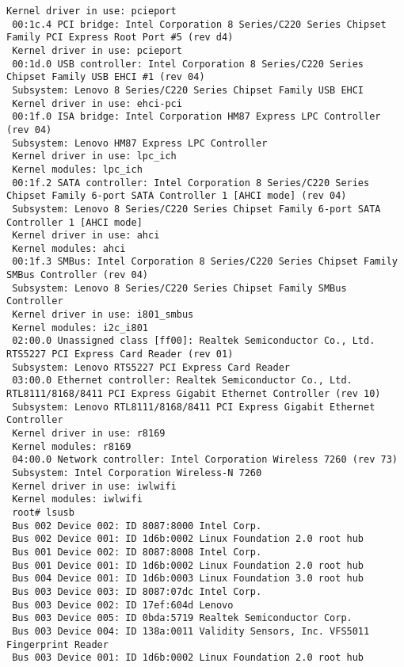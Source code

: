 \documentclass[10pt,a4paper]{article}
\begin{document}
\begin{lstlisting}[style=BashInputRoot]
 Kernel driver in use: pcieport
 00:1c.4 PCI bridge: Intel Corporation 8 Series/C220 Series Chipset Family PCI Express Root Port #5 (rev d4)
 Kernel driver in use: pcieport
 00:1d.0 USB controller: Intel Corporation 8 Series/C220 Series Chipset Family USB EHCI #1 (rev 04)
 Subsystem: Lenovo 8 Series/C220 Series Chipset Family USB EHCI
 Kernel driver in use: ehci-pci
 00:1f.0 ISA bridge: Intel Corporation HM87 Express LPC Controller (rev 04)
 Subsystem: Lenovo HM87 Express LPC Controller
 Kernel driver in use: lpc_ich
 Kernel modules: lpc_ich
 00:1f.2 SATA controller: Intel Corporation 8 Series/C220 Series Chipset Family 6-port SATA Controller 1 [AHCI mode] (rev 04)
 Subsystem: Lenovo 8 Series/C220 Series Chipset Family 6-port SATA Controller 1 [AHCI mode]
 Kernel driver in use: ahci
 Kernel modules: ahci
 00:1f.3 SMBus: Intel Corporation 8 Series/C220 Series Chipset Family SMBus Controller (rev 04)
 Subsystem: Lenovo 8 Series/C220 Series Chipset Family SMBus Controller
 Kernel driver in use: i801_smbus
 Kernel modules: i2c_i801
 02:00.0 Unassigned class [ff00]: Realtek Semiconductor Co., Ltd. RTS5227 PCI Express Card Reader (rev 01)
 Subsystem: Lenovo RTS5227 PCI Express Card Reader
 03:00.0 Ethernet controller: Realtek Semiconductor Co., Ltd. RTL8111/8168/8411 PCI Express Gigabit Ethernet Controller (rev 10)
 Subsystem: Lenovo RTL8111/8168/8411 PCI Express Gigabit Ethernet Controller
 Kernel driver in use: r8169
 Kernel modules: r8169
 04:00.0 Network controller: Intel Corporation Wireless 7260 (rev 73)
 Subsystem: Intel Corporation Wireless-N 7260
 Kernel driver in use: iwlwifi
 Kernel modules: iwlwifi
 root# lsusb
 Bus 002 Device 002: ID 8087:8000 Intel Corp. 
 Bus 002 Device 001: ID 1d6b:0002 Linux Foundation 2.0 root hub
 Bus 001 Device 002: ID 8087:8008 Intel Corp. 
 Bus 001 Device 001: ID 1d6b:0002 Linux Foundation 2.0 root hub
 Bus 004 Device 001: ID 1d6b:0003 Linux Foundation 3.0 root hub
 Bus 003 Device 003: ID 8087:07dc Intel Corp. 
 Bus 003 Device 002: ID 17ef:604d Lenovo 
 Bus 003 Device 005: ID 0bda:5719 Realtek Semiconductor Corp. 
 Bus 003 Device 004: ID 138a:0011 Validity Sensors, Inc. VFS5011 Fingerprint Reader
 Bus 003 Device 001: ID 1d6b:0002 Linux Foundation 2.0 root hub
                \end{lstlisting}
                
\end{document}
